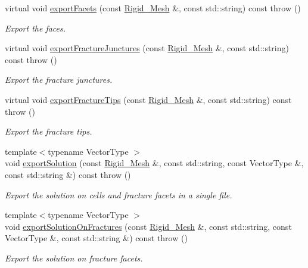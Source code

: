 \begin{DoxyCompactItemize}
virtual void \hyperlink{classFVCode3D_1_1ExporterCP_a03e66728ab8930153ab701c5f8a2689a}{export\+Facets} (const \hyperlink{classFVCode3D_1_1Rigid__Mesh}{Rigid\+\_\+\+Mesh} \&, const std\+::string) const   throw ()
\begin{DoxyCompactList}\small\item\em Export the faces. \end{DoxyCompactList}\item 
virtual void \hyperlink{classFVCode3D_1_1ExporterCP_a32860c649f9189c31948ecfd4de9a34c}{export\+Fracture\+Junctures} (const \hyperlink{classFVCode3D_1_1Rigid__Mesh}{Rigid\+\_\+\+Mesh} \&, const std\+::string) const   throw ()
\begin{DoxyCompactList}\small\item\em Export the fracture junctures. \end{DoxyCompactList}\item 
virtual void \hyperlink{classFVCode3D_1_1ExporterCP_a1389030cc506220cf76b586b1a854755}{export\+Fracture\+Tips} (const \hyperlink{classFVCode3D_1_1Rigid__Mesh}{Rigid\+\_\+\+Mesh} \&, const std\+::string) const   throw ()
\begin{DoxyCompactList}\small\item\em Export the fracture tips. \end{DoxyCompactList}\item 
{\footnotesize template$<$typename Vector\+Type $>$ }\\void \hyperlink{classFVCode3D_1_1ExporterCP_aa2a6910fd0b0c10b09ee07d305aeb747}{export\+Solution} (const \hyperlink{classFVCode3D_1_1Rigid__Mesh}{Rigid\+\_\+\+Mesh} \&, const std\+::string, const Vector\+Type \&, const std\+::string \&) const   throw ()
\begin{DoxyCompactList}\small\item\em Export the solution on cells and fracture facets in a single file. \end{DoxyCompactList}\item 
{\footnotesize template$<$typename Vector\+Type $>$ }\\void \hyperlink{classFVCode3D_1_1ExporterCP_a8bd1467dd4216c28980bbd4d8a886f76}{export\+Solution\+On\+Fractures} (const \hyperlink{classFVCode3D_1_1Rigid__Mesh}{Rigid\+\_\+\+Mesh} \&, const std\+::string, const Vector\+Type \&, const std\+::string \&) const   throw ()
\begin{DoxyCompactList}\small\item\em Export the solution on fracture facets. \end{DoxyCompactList}\item 

\end{DoxyCompactItemize}
